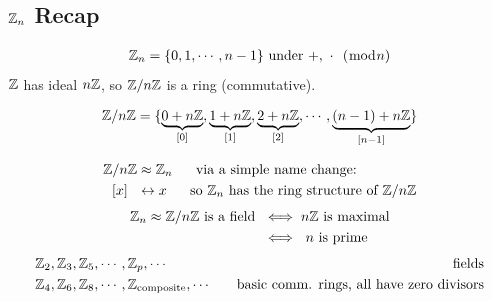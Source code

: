 \subsection{${\mathbb{ Z}}_n$ Recap}
\begin{align}
    {\mathbb{ Z}}_n = \{0,1,\cdots , n-1\} \text{ under  }  +,\ \cdot \ \ (\bmod n) \nonumber
\end{align}
${\mathbb{ Z}}$ has ideal $n{\mathbb{ Z}}$, so ${\mathbb{ Z}}/n{\mathbb{ Z}}$ is a ring (commutative).

\begin{align}
    {\mathbb{ Z}}/n{\mathbb{ Z}} = \{\underbrace{0+n{\mathbb{ Z}}}_{[0]}, \underbrace{1+n{\mathbb{ Z}}}_{[1]}, \underbrace{2+n{\mathbb{ Z}}}_{[2]}, \cdots , \underbrace{(n-1)+n{\mathbb{ Z}}}_{[n-1]}\} \nonumber
\end{align}

\begin{align}
    {\mathbb{ Z}}/n{\mathbb{ Z}} &\approx {\mathbb{ Z}}_n \ \ \ \ \text{    via a simple name change:} \nonumber \\
    [x] \ \ &\leftrightarrow x \ \ \ \ \text{    so }{\mathbb{ Z}}_n \text{ has the ring structure of }{\mathbb{ Z}}/n{\mathbb{ Z}} \nonumber
\end{align}
\begin{align}
    {\mathbb{ Z}}_n \approx {\mathbb{ Z}}/n{\mathbb{ Z}} \text{ is a field } &\iff n{\mathbb{ Z}} \text{ is maximal} \nonumber \\
    &\iff \ n \text{ is prime} \nonumber
\end{align}
\begin{align}
    &\Z_2, \Z_3, \Z_5, \cdots , \Z_p, \cdots \ \ &\text{ fields}\nonumber \\
    &\Z_4, \Z_6, \Z_8, \cdots , \Z_{\text{composite}}, \cdots \ \ &\text{ basic comm. rings, all have zero divisors} \nonumber
\end{align}
